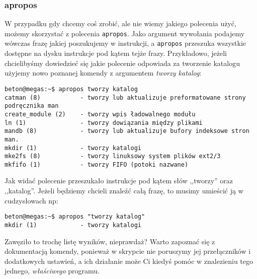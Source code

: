 \subsubsection{apropos}
W przypadku gdy chcemy coś zrobić, ale nie wiemy jakiego polecenia użyć, możemy skorzystać z polecenia \texttt{apropos}. Jako argument wywołania podajemy wówczas frazę jakiej poszukujemy w instrukcji, a \texttt{apropos} przeszuka wszystkie dostępne na dysku instrukcje pod kątem tejże frazy. Przykładowo, jeżeli chcielibyśmy dowiedzieć się jakie polecenie odpowiada za tworzenie katalogu użyjemy nowo poznanej komendy z argumentem \textit{tworzy katalog}:
\newline
\begin{verbatim}
beton@megas:~$ apropos tworzy katalog
catman (8)           - tworzy lub aktualizuje preformatowane strony podręcznika man
create_module (2)    - tworzy wpis ładowalnego modułu
ln (1)               - tworzy dowiązania między plikami
mandb (8)            - tworzy lub aktualizuje bufory indeksowe stron man.
mkdir (1)            - tworzy katalogi
mke2fs (8)           - tworzy linuksowy system plików ext2/3
mkfifo (1)           - tworzy FIFO (potoki nazwane)
\end{verbatim}
Jak widać polecenie przeszukało instrukcje pod kątem słów ,,tworzy'' oraz ,,katalog''. Jeżeli będziemy chcieli znaleźć całą frazę, to musimy umieścić ją w cudzysłowach np:
\newline
\begin{verbatim}
beton@megas:~$ apropos "tworzy katalog"
mkdir (1)            - tworzy katalogi
\end{verbatim}
Zawęziło to trochę listę wyników, nieprawdaż? Warto zapoznać się z dokumentacją komendy, ponieważ w skrypcie nie poruszymy jej przełączników i dodatkowych ustawień, a ich działanie może Ci kiedyś pomóc w znalezieniu tego jednego, \emph{właściwego} programu.

